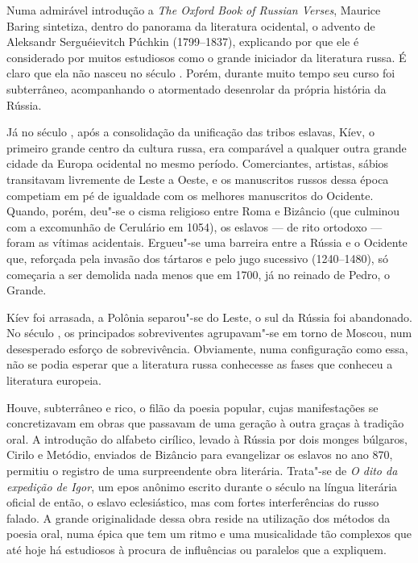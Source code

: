 Numa admirável introdução a \emph{The Oxford Book of Russian Verses},
Maurice Baring sintetiza, dentro do panorama da literatura ocidental, o
advento de Aleksandr Serguéievitch Púchkin (1799--1837), explicando por
que ele é considerado por muitos estudiosos como o grande iniciador da
literatura russa. É claro que ela não nasceu no século . Porém, durante muito tempo seu curso foi subterrâneo, acompanhando o atormentado
desenrolar da própria história da Rússia.

Já no século , após a consolidação da unificação das tribos eslavas,
Kíev, o primeiro grande centro da cultura russa, era comparável a
qualquer outra grande cidade da Europa ocidental no mesmo período.
Comerciantes, artistas, sábios transitavam livremente de Leste a Oeste,
e os manuscritos russos dessa época competiam em pé de igualdade com os
melhores manuscritos do Ocidente. Quando, porém, deu"-se o cisma
religioso entre Roma e Bizâncio (que culmi­nou com a excomunhão de
Cerulário em 1054), os eslavos --- de rito ortodoxo --- foram as vítimas
acidentais. Ergueu"-se uma barreira entre a Rússia e o Ociden­te que,
reforçada pela invasão dos tártaros e pelo jugo sucessivo (1240--1480),
só começaria a ser demolida nada menos que em 1700, já no reinado de
Pedro, o Grande.

Kíev foi arrasada, a Polônia separou"-se do Leste, o sul da Rússia foi
abando­nado. No século , os principados sobreviventes agrupavam"-se em
torno de Moscou, num desesperado esforço de sobrevivência. Obviamente,
numa con­figuração como essa, não se podia esperar que a literatura
russa conhecesse as fases que conheceu a literatura europeia.

Houve, subterrâneo e rico, o filão da poesia popular, cujas
manifestações se concretizavam em obras que passavam de uma geração à
outra graças à tradi­ção oral. A introdução do alfabeto cirílico,
levado à Rússia por dois monges búlgaros, Cirilo e Metódio, enviados de
Bizâncio para evangelizar os eslavos no ano 870, permitiu o registro de
uma surpreendente obra literária. Trata"-se de \emph{O dito da expedição de
Igor}, um epos anônimo escrito durante o século  na língua literária
oficial de então, o eslavo eclesiástico, mas com fortes interfe­rências
do russo falado. A grande originalidade dessa obra reside na utilização dos
métodos da poesia oral, numa épica que tem um ritmo e uma musicalidade
tão complexos que até hoje há estudiosos à procura de influências ou
paralelos que a expliquem.

